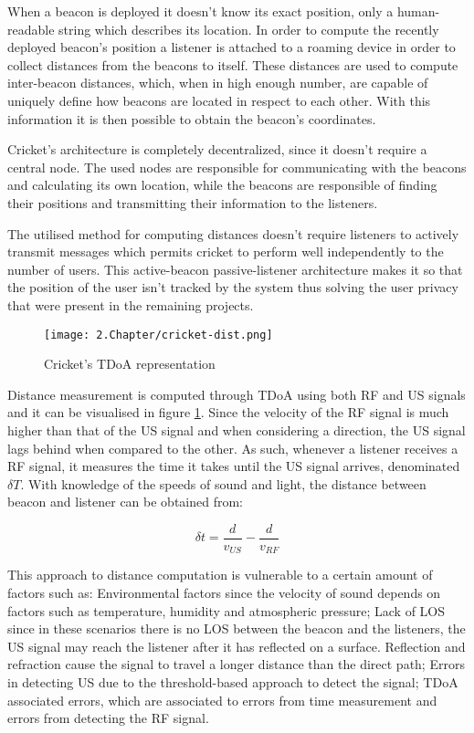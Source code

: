   
When a beacon is deployed it doesn't know its exact position, only a human-readable string which describes its location. In order to compute the recently deployed beacon's position a listener is attached to a roaming device in order to collect distances from the beacons to itself. These distances are used to compute inter-beacon distances, which, when in high enough number, are capable of uniquely define how beacons are located in respect to each other. With this information it is then possible to obtain the beacon's coordinates.  
  
  
Cricket's architecture is completely decentralized, since it doesn't require a central node. The used nodes are responsible for communicating with the beacons and calculating its own location, while the beacons are responsible of finding their positions and transmitting their information to the listeners.  
  
  
The utilised method for computing distances doesn't require listeners to actively transmit messages which permits cricket to perform well independently to the number of users. This active-beacon passive-listener architecture makes it so that the position of the user isn't tracked by the system thus solving the user privacy that were present in the remaining projects.  
  
  
\begin{figure}[H]  
\centering  
\texttt{[image: 2.Chapter/cricket-dist.png]}  
\caption[Cricket's \ac{TDoA} representation]{Cricket's \ac{TDoA} representation}  
\label{fig:cricket-tdoa}  
\end{figure}  
  
  
Distance measurement is computed through \ac{TDoA} using both \ac{RF} and \ac{US} signals and it can be visualised in figure \ref{fig:cricket-tdoa}. Since the velocity of the \ac{RF} signal is much higher than that of the \ac{US} signal and when considering a direction, the \ac{US} signal lags behind when compared to the other. As such, whenever a listener receives a \ac{RF} signal, it measures the time it takes until the \ac{US} signal arrives, denominated $\delta{T}$. With knowledge of the speeds of sound and light, the distance between beacon and listener can be obtained from:  
  
  
\begin{equation}  
\delta t = \frac{d}{v_{US}} - \frac{d}{v_{RF}}  
\end{equation}  
  
  
This approach to distance computation is vulnerable to a certain amount of factors such as: Environmental factors since the velocity of sound depends on factors such as temperature, humidity and atmospheric pressure; Lack of \ac{LOS} since in these scenarios there is no \ac{LOS} between the beacon and the listeners, the \ac{US} signal may reach the listener after it has reflected on a surface. Reflection and refraction cause the signal to travel a longer distance than the direct path; Errors in detecting \ac{US} due to the threshold-based approach to detect the signal; \ac{TDoA} associated errors, which are associated to errors from time measurement and errors from detecting the \ac{RF} signal.  
  
